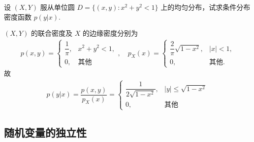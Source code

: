\documentclass[Prob-All.tex]{subfiles}
\begin{document}
\begin{frame}
	\begin{exam}
		设 $(X,Y)$ 服从单位圆 $D=\{(x,y):x^2+y^2<1\}$ 上的均匀分布，试求条件分布密度函数 $p (y|x)$.
	\end{exam}

	\jieda
	$(X,Y)$ 的联合密度及 $X$ 的边缘密度分别为
	\begin{eqnarray*}
		p(x,y)=\left\{
		\begin{array}{ll}
			\dfrac{1}{\pi}, & x^2+y^2<1,\\
			0, & \mbox{其他}
		\end{array}\right. ,\quad
		p_X(x)=\left\{\begin{array}{ll}
			\dfrac{2}{\pi}\sqrt{1-x^2}, & |x|<1,\\
			0, & \mbox{其他}.
		\end{array}\right.
	\end{eqnarray*}
	\pause 故
	\begin{eqnarray*}
		p(y|x)=\dfrac{p(x,y)}{p_X(x)}=\left\{
		\begin{array}{ll}
			\dfrac{1}{2\sqrt{1-x^2}}, & |y|\le \sqrt{1-x^2}\\
			0, &\mbox{其他}
		\end{array}
		\right.
	\end{eqnarray*}

\end{frame}


\subsection{随机变量的独立性}
\end{document}
